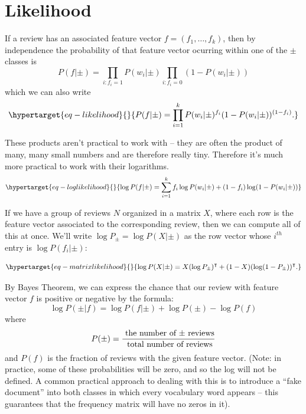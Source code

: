\documentclass[
  11pt,
  letterpaper,
]{scrbook}
\theoremstyle{plain}
\theoremstyle{plain}
\theoremstyle{remark}
\begin{document}
\hypertarget{likelihood}{%
\section{Likelihood}\label{likelihood}}

If a review has an associated feature vector \(f=(f_1,\ldots, f_k)\),
then by independence the probability of that feature vector ocurring
within one of the \(\pm\) classes is \[
P(f|\pm) = \prod_{i: f_{i}=1} P(w_{i}|\pm)\prod_{i: f_{i}=0}(1-P(w_{i}|\pm))
\] which we can also write
\begin{equation}\protect\hypertarget{eq-likelihood}{}{
P(f|\pm) = \prod_{i=1}^{k} P(w_{i}|\pm)^{f_{i}}(1-P(w_{i}|\pm))^{(1-f_{i})}.
}\label{eq-likelihood}\end{equation}

These products aren't practical to work with -- they are often the
product of many, many small numbers and are therefore really tiny.
Therefore it's much more practical to work with their logarithms.
\begin{equation}\protect\hypertarget{eq-loglikelihood}{}{
\log P(f|\pm) = \sum_{i=1}^{k} f_{i}\log P(w_{i}|\pm) + (1-f_{i})\log(1-P(w_{i}|\pm))
}\label{eq-loglikelihood}\end{equation}

If we have a group of reviews \(N\) organized in a matrix \(X\), where
each row is the feature vector associated to the corresponding review,
then we can compute all of this at once. We'll write
\(\log P_{\pm}=\log P(X|\pm)\) as the row vector whose \(i^{th}\) entry
is \(\log P(f_{i}|\pm)\):

\begin{equation}\protect\hypertarget{eq-matrixlikelihood}{}{
\log P(X|\pm) = X(\log P_{\pm})^{\intercal}+(1-X)(\log (1-P_{\pm}))^{\intercal}.
}\label{eq-matrixlikelihood}\end{equation}

By Bayes Theorem, we can express the chance that our review with feature
vector \(f\) is positive or negative by the formula: \[
\log P(\pm|f) = \log P(f|\pm)+\log P(\pm) - \log P(f)
\] where \[
P(\pm) = \frac{\hbox{ the number of $\pm$ reviews}}{\hbox{ total number of reviews}}
\] and \(P(f)\) is the fraction of reviews with the given feature
vector. (Note: in practice, some of these probabilities will be zero,
and so the log will not be defined. A common practical approach to
dealing with this is to introduce a ``fake document'' into both classes
in which every vocabulary word appears -- this guarantees that the
frequency matrix will have no zeros in it).
\end{document}
